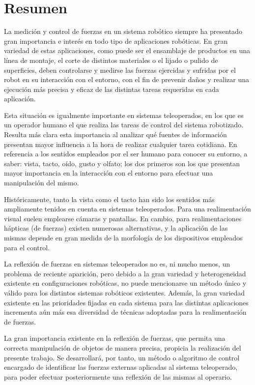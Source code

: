 \chapter{Resumen}

La medición y control de fuerzas en un sistema robótico siempre ha presentado gran importancia e interés en todo tipo de aplicaciones robóticas. En gran variedad de estas aplicaciones, como puede ser el ensamblaje de productos en una línea de montaje, el corte de distintos materiales o el lijado o pulido de superficies, deben controlarse y medirse las fuerzas ejercidas y sufridas por el robot en su interacción con el entorno, con el fin de prevenir daños y realizar una ejecución más precisa y eficaz de las distintas tareas requeridas en cada aplicación. \par 

Esta situación es igualmente importante en sistemas teleoperados, en los que es un operador humano el que realiza las tareas de control del sistema robotizado. Resulta más clara esta importancia al analizar qué fuentes de información presentan mayor influencia a la hora de realizar cualquier tarea cotidiana. En referencia a los sentidos empleados por el ser humano para conocer su entorno, a saber: vista, tacto, oído, gusto y olfato; los dos primeros son los que presentan mayor importancia en la interacción con el entorno para efectuar una manipulación del mismo. \par 

Históricamente, tanto la vista como el tacto han sido los sentidos más ampliamente tenidos en cuenta en sistemas teleoperados. Para una realimentación visual suelen emplearse cámaras y pantallas. En cambio, para realimentaciones hápticas (de fuerzas) existen numerosas alternativas, y la aplicación de las mismas depende en gran medida de la morfología de los dispositivos empleados para el control. \par 

La reflexión de fuerzas en sistemas teleoperados no es, ni mucho menos, un problema de reciente aparición, pero debido a la gran variedad y heterogeneidad existente en configuraciones robóticas, no puede mencionarse un método único y válido para los distintos sistemas robóticos existentes. Además, la gran variedad existente en las prioridades fijadas en cada sistema para las distintas aplicaciones incrementa aún más esa diversidad de técnicas adoptadas para la realimentación de fuerzas. \par 

La gran importancia existente en la reflexión de fuerzas, que permita una correcta manipulación de objetos de manera precisa, propicia la realización del presente trabajo. Se desarrollará, por tanto, un método o algoritmo de control encargado de identificar las fuerzas externas aplicadas al sistema teleoperado, para poder efectuar posteriormente una reflexión de las mismas al operario. \par  

